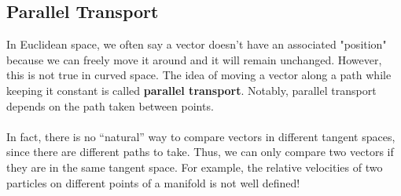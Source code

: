 \documentclass[11pt]{article}
\begin{document}
\subsection{Parallel Transport}
In Euclidean space, we often say a vector doesn't have an associated "position" because we can freely move it around and it will remain unchanged. However, this is not true in curved space. The idea of moving a vector along a path while keeping it constant is called \textbf{parallel transport}. Notably,
parallel transport depends on the path taken between points. 
\\
\\
In fact, there is no ``natural'' way to compare vectors in different tangent spaces, since there are different paths to take. Thus, we can only compare two vectors if they are in the same tangent space. For example, the relative velocities of two particles on different points of a manifold is not well defined!
\end{document}
